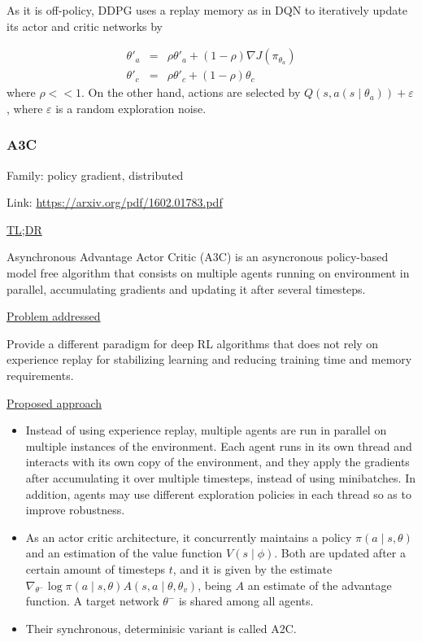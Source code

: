 \documentclass[12pt, english]{article}
\begin{document}
As it is off-policy, DDPG uses a replay memory as in DQN to iteratively update its actor and critic networks by

\begin{eqnarray}
  \theta'_a &=& \rho \theta'_a + (1-\rho) \nabla J (\pi_{\theta_a}) \\
  \theta'_c &=& \rho \theta'_c + (1-\rho) \theta_c
\end{eqnarray}
%
where $\rho << 1$.
On the other hand, actions are selected by $Q(s, a(s \mid \theta_a)) + \varepsilon$, where $\varepsilon$ is a random exploration noise.


\subsubsection{A3C}
\label{A3C}

Family: policy gradient, distributed

Link: \url{https://arxiv.org/pdf/1602.01783.pdf}

\underline{TL;DR}

Asynchronous Advantage Actor Critic (A3C) \cite{mnih_asynchronous_2016} is an asyncronous policy-based model free algorithm that consists on multiple agents running on environment in parallel, accumulating gradients and updating it after several timesteps.

\underline{Problem addressed}

Provide a different paradigm for deep RL algorithms that does not rely on experience replay for stabilizing learning and reducing training time and memory requirements.

\underline{Proposed approach}

\begin{itemize}
  \item Instead of using experience replay, multiple agents are run in parallel on multiple instances of the environment. Each agent runs in its own thread and interacts with its own copy of the environment, and they apply the gradients after accumulating it over multiple timesteps, instead of using minibatches. In addition, agents may use different exploration policies in each thread so as to improve robustness.
  \item As an actor critic architecture, it concurrently maintains a policy $\pi(a \mid s, \theta)$ and an estimation of the value function $V(s \mid \phi)$. Both are updated after a certain amount of timesteps $t$, and it is given by the estimate $\nabla_{\theta^-} \log \pi (a \mid s, \theta) A(s,a \mid \theta, \theta_v)$, being $A$ an estimate of the advantage function. A target network $\theta^-$ is shared among all agents.
  \item Their synchronous, determinisic variant is called A2C.
\end{itemize}
\end{document}
